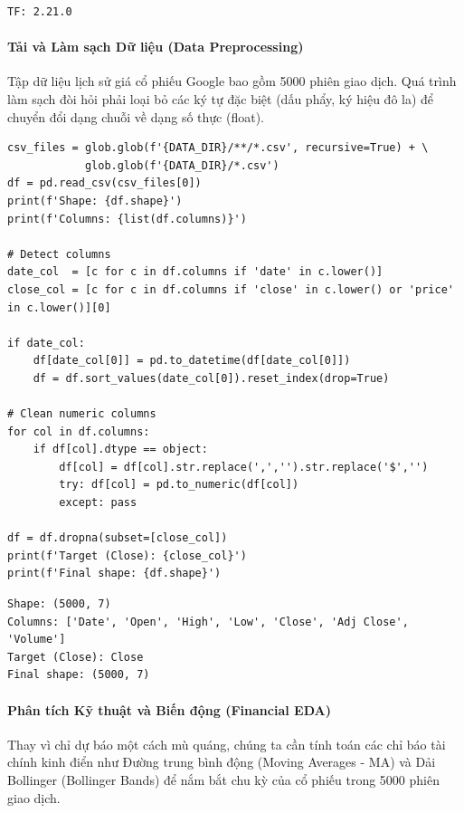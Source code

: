 \begin{lstlisting}[style=consoleoutput, caption={Output: Phiên bản TensorFlow}]
TF: 2.21.0
\end{lstlisting}

\paragraph{Tải và Làm sạch Dữ liệu (Data Preprocessing)} \hfill\mbox{}

Tập dữ liệu lịch sử giá cổ phiếu Google bao gồm 5000 phiên giao dịch. Quá trình làm sạch đòi hỏi phải loại bỏ các ký tự đặc biệt (dấu phẩy, ký hiệu đô la) để chuyển đổi dạng chuỗi về dạng số thực (float).

\begin{lstlisting}[style=pythoncode, caption={Đọc dữ liệu và làm sạch cột số}]
csv_files = glob.glob(f'{DATA_DIR}/**/*.csv', recursive=True) + \
            glob.glob(f'{DATA_DIR}/*.csv')
df = pd.read_csv(csv_files[0])
print(f'Shape: {df.shape}')
print(f'Columns: {list(df.columns)}')

# Detect columns
date_col  = [c for c in df.columns if 'date' in c.lower()]
close_col = [c for c in df.columns if 'close' in c.lower() or 'price' in c.lower()][0]

if date_col:
    df[date_col[0]] = pd.to_datetime(df[date_col[0]])
    df = df.sort_values(date_col[0]).reset_index(drop=True)

# Clean numeric columns
for col in df.columns:
    if df[col].dtype == object:
        df[col] = df[col].str.replace(',','').str.replace('$','')
        try: df[col] = pd.to_numeric(df[col])
        except: pass

df = df.dropna(subset=[close_col])
print(f'Target (Close): {close_col}')
print(f'Final shape: {df.shape}')
\end{lstlisting}

\begin{lstlisting}[style=consoleoutput, caption={Output: Thông tin tập dữ liệu}]
Shape: (5000, 7)
Columns: ['Date', 'Open', 'High', 'Low', 'Close', 'Adj Close', 'Volume']
Target (Close): Close
Final shape: (5000, 7)
\end{lstlisting}

\paragraph{Phân tích Kỹ thuật và Biến động (Financial EDA)} \hfill\mbox{}

Thay vì chỉ dự báo một cách mù quáng, chúng ta cần tính toán các chỉ báo tài chính kinh điển như Đường trung bình động (Moving Averages - MA) và Dải Bollinger (Bollinger Bands) để nắm bắt chu kỳ của cổ phiếu trong 5000 phiên giao dịch.

